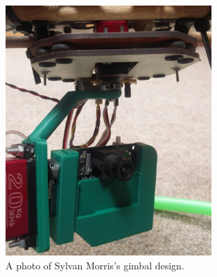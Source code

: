 \begin{figure}[ht!]
  \centering
  \includegraphics[width=0.7\textwidth]{literature_review/sylvan_gimbal.jpg}
  \caption{\label{fig:sylvan_gimbal} A photo of Sylvan Morris's gimbal design.}
\end{figure}

